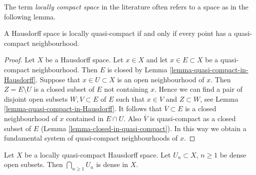 \noindent
The term {\it locally compact space} in the literature often refers
to a space as in the following lemma.

\begin{lemma}
\label{lemma-locally-quasi-compact-Hausdorff}
A Hausdorff space is locally quasi-compact if and only if every point
has a quasi-compact neighbourhood.
\end{lemma}

\begin{proof}
Let $X$ be a Hausdorff space. Let $x \in X$ and let $x \in E \subset X$
be a quasi-compact neighbourhood. Then $E$ is closed by
Lemma \ref{lemma-quasi-compact-in-Hausdorff}.
Suppose that $x \in U \subset X$ is an open neighbourhood of $x$.
Then $Z = E \setminus U$ is a closed subset of $E$ not containing $x$.
Hence we can find a pair of disjoint open subsets $W, V \subset E$
of $E$ such that $x \in V$ and $Z \subset W$, see
Lemma \ref{lemma-quasi-compact-in-Hausdorff}.
It follows that $\overline{V} \subset E$ is a closed neighbourhood
of $x$ contained in $E \cap U$. Also $\overline{V}$ is quasi-compact
as a closed subset of $E$ (Lemma \ref{lemma-closed-in-quasi-compact}).
In this way we obtain a fundamental system of quasi-compact neighbourhoods
of $x$.
\end{proof}

\begin{lemma}
\label{lemma-baire-category-locally-compact}
Let $X$ be a locally quasi-compact Hausdorff space.
Let $U_n \subset X$, $n \geq 1$ be dense open subsets. Then
$\bigcap_{n \geq 1} U_n$ is dense in $X$.
\end{lemma}

